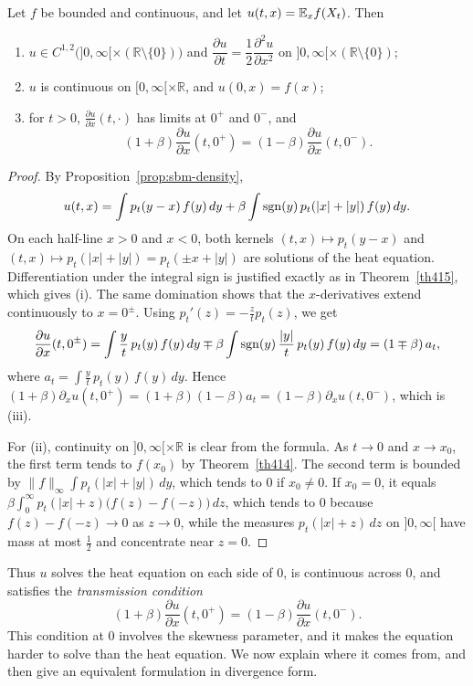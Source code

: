 \begin{proposition}\label{prop:sbm-pde}
	Let $f$ be bounded and continuous, and let $u(t,x) = \mathbb{E}_x f(X_t)$. Then
	\begin{enumerate}[label=(\roman*)]
		\item $u\in C^{1,2}\bigl(]0,\infty[\times(\mathbb{R}\setminus\{0\})\bigr)$ and
		      $\dfrac{\partial u}{\partial t} = \dfrac{1}{2}\dfrac{\partial^2u}{\partial x^2}$
		      on $]0,\infty[\times(\mathbb{R}\setminus\{0\})$;
		\item $u$ is continuous on $[0,\infty[\times\mathbb{R}$, and $u(0,x) = f(x)$;
		\item for $t>0$, $\frac{\partial u}{\partial x}(t,\cdot)$ has limits at
		      $0^+$ and $0^-$, and
		      \[
			      (1+\beta)\frac{\partial u}{\partial x}(t,0^+) = (1-\beta)\frac{\partial u}{\partial x}(t,0^-).
		      \]
	\end{enumerate}
\end{proposition}
\begin{proof}
	By Proposition~\ref{prop:sbm-density},
	\[
		u(t,x) = \int p_t(y-x)\,f(y)\,dy + \beta\int\operatorname{sgn}(y)\,p_t(|x|+|y|)\,f(y)\,dy .
	\]
	On each half-line $x>0$ and $x<0$, both kernels $(t,x)\mapsto p_t(y-x)$ and
	$(t,x)\mapsto p_t(|x|+|y|) = p_t(\pm x + |y|)$ are solutions of the heat
	equation. Differentiation under the integral sign is justified exactly as in
	Theorem~\ref{th415}, which gives (i). The same domination shows that the
	$x$-derivatives extend continuously to $x = 0^\pm$. Using
	$p_t'(z) = -\frac{z}{t}p_t(z)$, we get
	\[
		\frac{\partial u}{\partial x}(t,0^\pm)
		= \int\frac{y}{t}\,p_t(y)\,f(y)\,dy
		\mp\beta\int\operatorname{sgn}(y)\,\frac{|y|}{t}\,p_t(y)\,f(y)\,dy
		= (1\mp\beta)\,a_t,
	\]
	where $a_t = \int\frac{y}{t}\,p_t(y)\,f(y)\,dy$. Hence
	$(1+\beta)\partial_xu(t,0^+) = (1+\beta)(1-\beta)a_t = (1-\beta)\partial_xu(t,0^-)$,
	which is (iii).

	For (ii), continuity on $]0,\infty[\times\mathbb{R}$ is clear from the
	formula. As $t\to0$ and $x\to x_0$, the first term tends to $f(x_0)$ by
	Theorem~\ref{th414}. The second term is bounded by
	$\|f\|_\infty\int p_t(|x|+|y|)\,dy$, which tends to $0$ if $x_0\neq0$. If
	$x_0 = 0$, it equals
	$\beta\int_0^\infty p_t(|x|+z)\bigl(f(z)-f(-z)\bigr)\,dz$, which tends to
	$0$ because $f(z)-f(-z)\to0$ as $z\to0$, while the measures
	$p_t(|x|+z)\,dz$ on $]0,\infty[$ have mass at most $\frac12$ and concentrate
	near $z = 0$.
\end{proof}

Thus $u$ solves the heat equation on each side of $0$, is continuous across
$0$, and satisfies the \emph{transmission condition}
\[
	(1+\beta)\frac{\partial u}{\partial x}(t,0^+) = (1-\beta)\frac{\partial u}{\partial x}(t,0^-).
\]
This condition at $0$ involves the skewness parameter, and it makes the
equation harder to solve than the heat equation. We now explain where it comes
from, and then give an equivalent formulation in divergence form.

